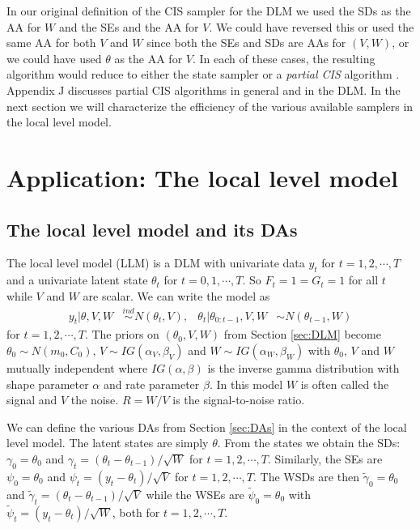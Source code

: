\documentclass[12pt]{article}
\begin{document}
In our original definition of the CIS sampler for the DLM we used the SDs as the AA for $W$ and the SEs and the AA for $V$. We could have reversed this or used the same AA for both $V$ and $W$ since both the SEs and SDs are AAs for $(V,W)$, or we could have used $\theta$ as the AA for $V$. In each of these cases, the resulting algorithm would reduce to either the state sampler or a {\it partial CIS} algorithm \citep{yu2011center}. Appendix J discusses partial CIS algorithms in general and in the DLM. In the next section we will characterize the efficiency of the various available samplers in the local level model.

\section{Application: The local level model}\label{sec:LLM}

\subsection{The local level model and its DAs}

The local level model (LLM) is a DLM with univariate data $y_t$ for $t=1,2,\cdots,T$ and a univariate latent state $\theta_t$ for $t=0,1,\cdots,T$. So $F_t=1=G_t=1$ for all $t$ while $V$ and $W$ are scalar. We can write the model as
\begin{align*}
  y_t |\theta,V,W& \stackrel{ind}{\sim} N(\theta_t,V), &
  \theta_t |\theta_{0:t-1},V,W& \sim N(\theta_{t-1},W)
\end{align*}
for $t=1,2,\cdots,T$. The priors on $(\theta_0,V,W)$ from Section \ref{sec:DLM} become $\theta_0\sim N(m_0,C_0)$, $V\sim IG(\alpha_V,\beta_V)$ and $W\sim IG(\alpha_W,\beta_W)$ with $\theta_0$, $V$ and $W$ mutually independent where $IG(\alpha,\beta)$ is the inverse gamma distribution with shape parameter $\alpha$ and rate parameter $\beta$. In this model $W$ is often called the signal and $V$ the noise. $R=W/V$ is the signal-to-noise ratio.

We can define the various DAs from Section \ref{sec:DAs} in the context of the local level model. The latent states are simply $\theta$. From the states we obtain the SDs: $\gamma_0=\theta_0$ and $\gamma_t = (\theta_t - \theta_{t-1})/\sqrt{W}$ for $t=1,2,\cdots,T$. Similarly, the SEs are $\psi_0=\theta_0$ and $\psi_t = (y_t - \theta_t)/\sqrt{V}$ for $t=1,2,\cdots,T$. The WSDs are then $\tilde{\gamma}_{0}=\theta_0$ and $\tilde{\gamma}_t = (\theta_t - \theta_{t-1})/\sqrt{V}$ while the WSEs are $\tilde{\psi}_0=\theta_0$ with $\tilde{\psi}_t = (y_t - \theta_t)/\sqrt{W}$, both for $t=1,2,\cdots,T$. 
\end{document}
